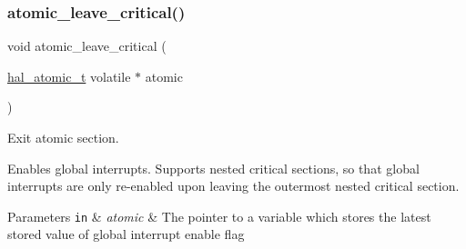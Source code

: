 \subsubsection{\texorpdfstring{atomic\+\_\+leave\+\_\+critical()}{atomic\_leave\_critical()}}
{\footnotesize\ttfamily void atomic\+\_\+leave\+\_\+critical (\begin{DoxyParamCaption}\item[{\hyperlink{group__doc__driver__hal__helper__atomic_ga6b3a0c9eea25111ac1877e0302e2fe1c}{hal\+\_\+atomic\+\_\+t} volatile $\ast$}]{atomic }\end{DoxyParamCaption})}



Exit atomic section. 

Enables global interrupts. Supports nested critical sections, so that global interrupts are only re-\/enabled upon leaving the outermost nested critical section.


\begin{DoxyParams}[1]{Parameters}
\mbox{\tt in}  & {\em atomic} & The pointer to a variable which stores the latest stored value of global interrupt enable flag \\
\hline
\end{DoxyParams}
